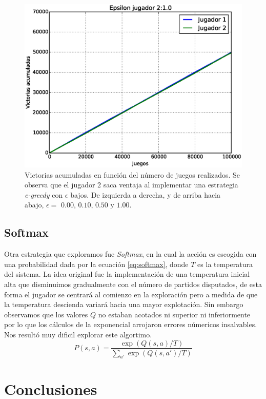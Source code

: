 \documentclass[11pt, spanish]{article}
\begin{document}
\begin{figure}
\includegraphics[scale = 0.3]{figuras/Epsilon10.eps}
\caption{Victorias acumuladas en función del número de juegos realizados. Se 
observa que el jugador 2 saca ventaja al implementar una estrategia 
\emph{e-greedy} con $\epsilon$ bajos. De izquierda a derecha, y de arriba hacia 
abajo, $\epsilon = $ $0.00$, $0.10$, $0.50$ y $1.00$.}
\label{fig:e_greedy}
\end{figure}

\subsection{Softmax}
\par Otra estrategia que exploramos fue \emph{Softmax}, en la cual la acción es 
escogida con una probabilidad dada por la ecuación \ref{eq:softmax}, donde 
$T$ es la temperatura del sistema. La idea original fue la implementación de 
una temperatura inicial alta que disminuimos gradualmente con el número de 
partidos disputados, de esta forma el jugador se centrará al comienzo en la 
exploración pero a medida de que la temperatura descienda variará hacia una 
mayor explotación. Sin embargo observamos que los valores $Q$ no estaban 
acotados ni superior ni inferiormente por lo que los cálculos de la 
exponencial arrojaron errores númericos insalvables. Nos resultó 
muy dificil explorar este algortimo.
\begin{equation}
P(s,a) = \frac{\exp(Q(s,a)/T)}{\sum_{a'}{\exp(Q(s,a')/T)}}
\label{eq:softmax}
\end{equation}

\section{Conclusiones}
\end{document}
